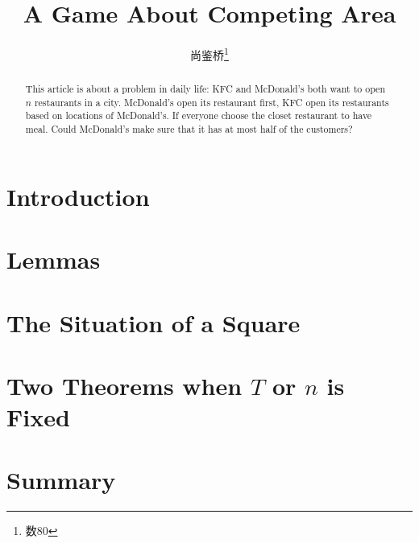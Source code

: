 \documentclass[twoside]{article}
\begin{document}
\title{A Game About Competing Area}
\author{尚鉴桥\footnote{数80}}

\begin{abstract}
	This article is about a problem in daily life: KFC and McDonald's both want to open $n$ restaurants in a city. McDonald's open its restaurant first, KFC open its restaurants based on locations of McDonald's. If everyone choose the closet restaurant to have meal. Could McDonald's make sure that it has at most half of the customers?
\end{abstract}

\tableofcontents
\bigskip



\section{Introduction}



\section{Lemmas}



\section{The Situation of a Square}



\section{Two Theorems when \texorpdfstring{$T$}{T} or \texorpdfstring{$n$}{n} is Fixed}



\section{Summary}


\end{document}
